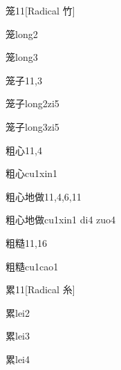 \begin{entry}{笼}{11}[Radical 竹]
  \begin{phonetics}{笼}{long2}
  \end{phonetics}
  \begin{phonetics}{笼}{long3}
  \end{phonetics}
\end{entry}

\begin{entry}{笼子}{11,3}
  \begin{phonetics}{笼子}{long2zi5}
  \end{phonetics}
  \begin{phonetics}{笼子}{long3zi5}
  \end{phonetics}
\end{entry}

\begin{entry}{粗心}{11,4}
  \begin{phonetics}{粗心}{cu1xin1}
  \end{phonetics}
\end{entry}

\begin{entry}{粗心地做}{11,4,6,11}
  \begin{phonetics}{粗心地做}{cu1xin1 di4 zuo4}
  \end{phonetics}
\end{entry}

\begin{entry}{粗糙}{11,16}
  \begin{phonetics}{粗糙}{cu1cao1}
  \end{phonetics}
\end{entry}

\begin{entry}{累}{11}[Radical 糸]
  \begin{phonetics}{累}{lei2}
  \end{phonetics}
  \begin{phonetics}{累}{lei3}
  \end{phonetics}
  \begin{phonetics}{累}{lei4}
  \end{phonetics}
\end{entry}

